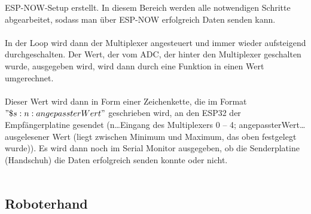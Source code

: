 \documentclass[11pt]{article}
\begin{document}
ESP-NOW-Setup erstellt. In diesem Bereich werden alle notwendigen Schritte abgearbeitet, sodass man über ESP-NOW erfolgreich 
Daten senden kann. \\
\\
In der Loop wird dann der Multiplexer angesteuert und immer wieder aufsteigend durchgeschalten. Der Wert, der vom ADC, der
hinter den Multiplexer geschalten wurde, ausgegeben wird, wird dann durch eine Funktion in einen Wert umgerechnet. \\
\\
Dieser Wert wird dann in Form einer Zeichenkette, die im Format $"\$s:n:angepassterWert"$ geschrieben wird, an den ESP32 der 
Empfängerplatine gesendet (n…Eingang des Multiplexers 0 – 4; angepassterWert…ausgelesener Wert (liegt zwischen Minimum und 
Maximum, das oben festgelegt wurde)). Es wird dann noch im Serial Monitor ausgegeben, ob die Senderplatine (Handschuh) die 
Daten erfolgreich senden konnte oder nicht. \\
\\

\subsection{Roboterhand}
\end{document}
